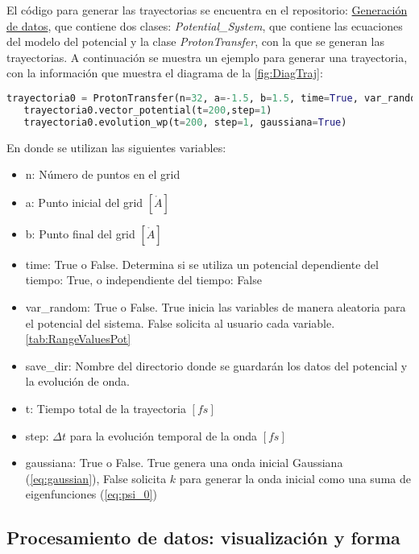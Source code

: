  El código para generar las trayectorias se encuentra en el repositorio: \href{https://github.com/Jessi-MM/PropagatorLearning/blob/main/src/Proton_Transfer_DataGenerate.ipynb}{\faGithub Generación de datos}, que contiene dos clases: \emph{Potential\_System}, que contiene las ecuaciones del modelo del potencial y la clase \emph{ProtonTransfer}, con la que se generan las trayectorias. A continuación se muestra un ejemplo para generar una trayectoria, con la información que muestra el diagrama de la \autoref{fig:DiagTraj}:

 \begin{lstlisting}[language=Python, morekeywords={ProtonTransfer, True, False}]
   trayectoria0 = ProtonTransfer(n=32, a=-1.5, b=1.5, time=True, var_random=True, save_dir='data0')
   trayectoria0.vector_potential(t=200,step=1)
   trayectoria0.evolution_wp(t=200, step=1, gaussiana=True)\end{lstlisting}

En donde se utilizan las siguientes variables:
\begin{itemize}[label=\textcolor{CTtitle}{\textbullet}]
\item n: Número de puntos en el grid
\item a: Punto inicial del grid $[\mathring{A}]$
\item b: Punto final del grid $[\mathring{A}]$
\item time: True o False. Determina si se utiliza un potencial dependiente del tiempo: True, o independiente del tiempo: False  
\item var\_random: True o False. True inicia las variables de manera aleatoria para el potencial del sistema. False solicita al usuario cada variable. \autoref{tab:RangeValuesPot}
\item save\_dir: Nombre del directorio donde se guardarán los datos del potencial y la evolución de onda.
\item t: Tiempo total de la trayectoria $[fs]$
\item step: $\Delta t$ para la evolución temporal de la onda $[fs]$
\item gaussiana: True o False. True genera una onda inicial Gaussiana (\autoref{eq:gaussian}), False solicita $k$ para generar la onda inicial como una suma de eigenfunciones (\autoref{eq:psi_0}) 
\end{itemize}

\subsection{Procesamiento de datos: visualización y forma}

